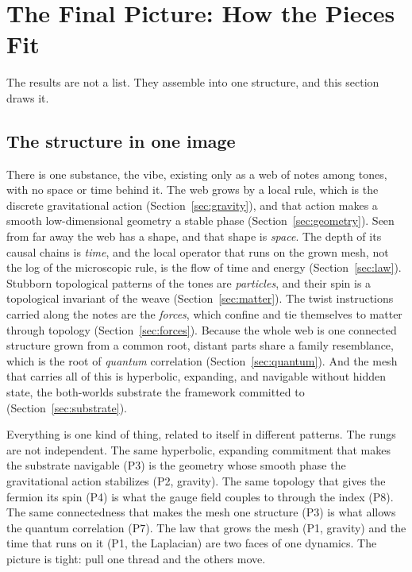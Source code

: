 \section{The Final Picture: How the Pieces Fit}
\label{sec:picture}

The results are not a list. They assemble into one structure, and this section draws it.

\subsection{The structure in one image}

There is one substance, the vibe, existing only as a web of notes among tones, with no space or time behind it. The web grows by a local rule, which is the discrete gravitational action (Section~\ref{sec:gravity}), and that action makes a smooth low-dimensional geometry a stable phase (Section~\ref{sec:geometry}). Seen from far away the web has a shape, and that shape is \emph{space}. The depth of its causal chains is \emph{time}, and the local operator that runs on the grown mesh, not the log of the microscopic rule, is the flow of time and energy (Section~\ref{sec:law}). Stubborn topological patterns of the tones are \emph{particles}, and their spin is a topological invariant of the weave (Section~\ref{sec:matter}). The twist instructions carried along the notes are the \emph{forces}, which confine and tie themselves to matter through topology (Section~\ref{sec:forces}). Because the whole web is one connected structure grown from a common root, distant parts share a family resemblance, which is the root of \emph{quantum} correlation (Section~\ref{sec:quantum}). And the mesh that carries all of this is hyperbolic, expanding, and navigable without hidden state, the both-worlds substrate the framework committed to (Section~\ref{sec:substrate}).

Everything is one kind of thing, related to itself in different patterns. The rungs are not independent. The same hyperbolic, expanding commitment that makes the substrate navigable (P3) is the geometry whose smooth phase the gravitational action stabilizes (P2, gravity). The same topology that gives the fermion its spin (P4) is what the gauge field couples to through the index (P8). The same connectedness that makes the mesh one structure (P3) is what allows the quantum correlation (P7). The law that grows the mesh (P1, gravity) and the time that runs on it (P1, the Laplacian) are two faces of one dynamics. The picture is tight: pull one thread and the others move.

